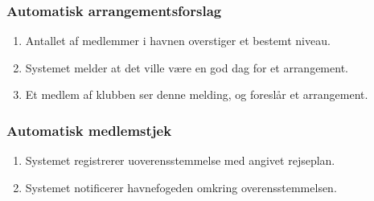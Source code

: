     \subsubsection{Automatisk arrangementsforslag}

    \begin{enumerate}
      \item Antallet af medlemmer i havnen overstiger et bestemt niveau.
      \item Systemet melder at det ville være en god dag for et arrangement.
      \item Et medlem af klubben ser denne melding, og foreslår et arrangement.
    \end{enumerate}

    \subsubsection{Automatisk medlemstjek}

    \begin{enumerate}
      \item Systemet registrerer uoverensstemmelse med angivet rejseplan.
      \item Systemet notificerer havnefogeden omkring overensstemmelsen.
    \end{enumerate}

